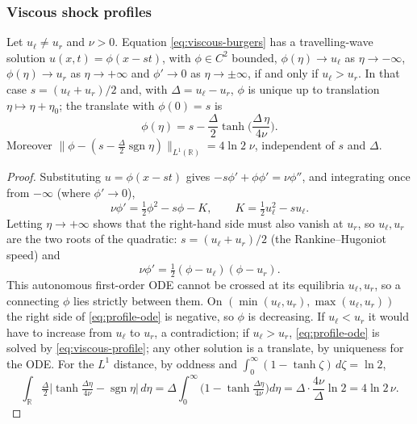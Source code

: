 \subsubsection{Viscous shock profiles}
\label{subsubsec:viscous-profiles}

\begin{proposition}
\label{prop:viscous-profile}
Let $u_\ell\neq u_r$ and $\nu>0$. Equation \eqref{eq:viscous-burgers} has a
travelling-wave solution $u(x,t)=\phi(x-st)$, with $\phi\in C^2$ bounded,
$\phi(\eta)\to u_\ell$ as $\eta\to-\infty$, $\phi(\eta)\to u_r$ as $\eta\to+\infty$
and $\phi'\to0$ as $\eta\to\pm\infty$, if and only if $u_\ell>u_r$. In that case
$s=(u_\ell+u_r)/2$ and, with $\Delta=u_\ell-u_r$, $\phi$ is unique up to
translation $\eta\mapsto\eta+\eta_0$; the translate with $\phi(0)=s$ is
\begin{equation}
  \label{eq:viscous-profile}
  \phi(\eta)=s-\frac{\Delta}{2}\tanh\!\Big(\frac{\Delta\,\eta}{4\nu}\Big).
\end{equation}
Moreover $\|\phi-(s-\tfrac\Delta2\operatorname{sgn}\eta)\|_{L^1(\mathbb{R})}
=4\ln2\;\nu$, independent of $s$ and $\Delta$.
\end{proposition}

\begin{proof}
Substituting $u=\phi(x-st)$ gives $-s\phi'+\phi\phi'=\nu\phi''$, and
integrating once from $-\infty$ (where $\phi'\to0$),
\begin{equation*}
  \nu\phi'=\tfrac12\phi^2-s\phi-K,\qquad K=\tfrac12u_\ell^2-su_\ell .
\end{equation*}
Letting $\eta\to+\infty$ shows that the right-hand side must also vanish at
$u_r$, so $u_\ell,u_r$ are the two roots of the quadratic: $s=(u_\ell+u_r)/2$
(the Rankine--Hugoniot speed) and
\begin{equation}
  \label{eq:profile-ode}
  \nu\phi'=\tfrac12(\phi-u_\ell)(\phi-u_r).
\end{equation}
This autonomous first-order ODE cannot be crossed at its equilibria
$u_\ell,u_r$, so a connecting $\phi$ lies strictly between them. On
$(\min(u_\ell,u_r),\max(u_\ell,u_r))$ the right side of \eqref{eq:profile-ode}
is negative, so $\phi$ is decreasing. If $u_\ell<u_r$ it would have to
increase from $u_\ell$ to $u_r$, a contradiction; if $u_\ell>u_r$,
\eqref{eq:profile-ode} is solved by \eqref{eq:viscous-profile}; any other solution is a translate, by
uniqueness for the ODE. For the $L^1$
distance, by oddness and $\int_0^\infty(1-\tanh\zeta)\,d\zeta=\ln2$,
\begin{equation*}
  \int_{\mathbb{R}}\tfrac\Delta2\Big|\tanh\tfrac{\Delta\eta}{4\nu}-\operatorname{sgn}\eta\Big|\,d\eta
  =\Delta\int_0^\infty\Big(1-\tanh\tfrac{\Delta\eta}{4\nu}\Big)d\eta
  =\Delta\cdot\frac{4\nu}{\Delta}\ln2=4\ln2\,\nu .
\end{equation*}
\end{proof}

